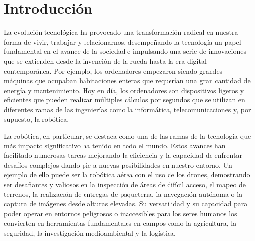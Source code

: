 \chapter{Introducción}
\label{cap:introduccion}
\setcounter{page}{1}

La evolución tecnológica ha provocado una transformación radical en nuestra forma de vivir, trabajar y relacionarnos, desempeñando la tecnología un papel 
fundamental en el avance de la sociedad e impulsando una serie de innovaciones que se extienden desde la invención de la rueda hasta la era digital contemporánea. 
Por ejemplo, los ordenadores empezaron siendo grandes máquinas que ocupaban habitaciones enteras que requerían una gran cantidad de energía y mantenimiento. Hoy en día, los ordenadores
son dispositivos ligeros y eficientes que pueden realizar múltiples cálculos por segundos que se utilizan en diferentes ramas de las ingenierías como la informática, telecomunicaciones y,
por supuesto, la robótica.

La robótica, en particular, se destaca como una de las ramas de la tecnología que más impacto significativo ha tenido en todo el mundo. Estos avances han facilitado numerosas tareas mejorando la eficiencia 
y la capacidad de enfrentar desafíos complejos dando pie a nuevas posibilidades en nuestro entorno. Un ejemplo de ello puede ser la robótica aérea con el uso de los drones, 
demostrando ser desafiantes y valiosos en la inspección de áreas de difícil acceso, el mapeo de terrenos, la realización de entregas de paqueteria, la navegación autónoma o la captura 
de imágenes desde alturas elevadas. Su versatilidad y su capacidad para poder operar en entornos peligrosos o inaccesibles para los seres humanos los convierten 
en herramientas fundamentales en campos como la agricultura, la seguridad, la investigación medioambiental y la logística. 

